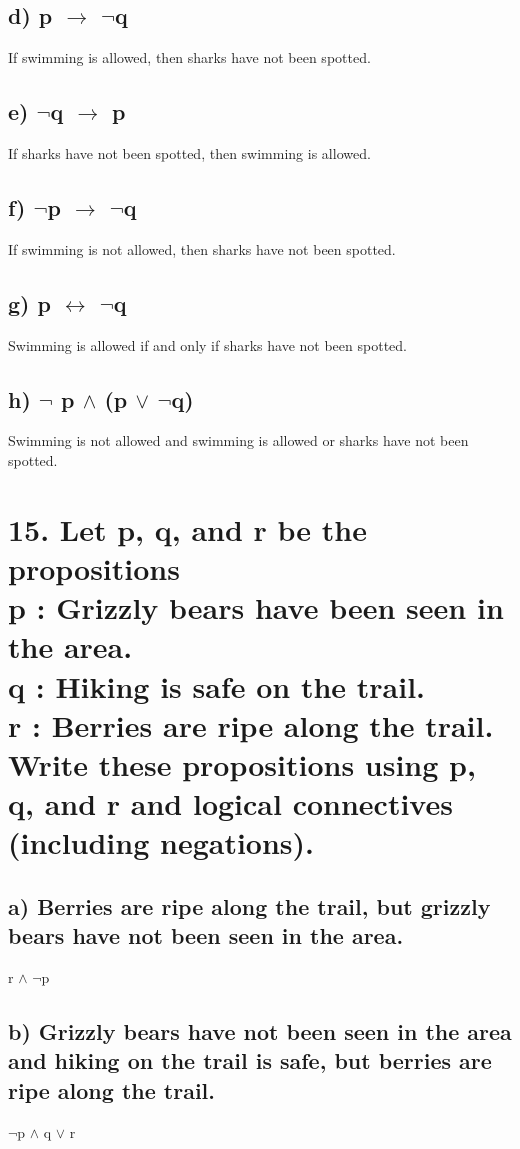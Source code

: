 \documentclass[11pt, oneside]{article} %
\numberwithin{equation}{section} %
\numberwithin{figure}{section} %
\begin{document}
\subsection{d) p $\rightarrow$ $\neg$q}
If swimming is allowed, then sharks have not been spotted.
\subsection{e) $\neg$q $\rightarrow$ p}
If sharks have not been spotted, then swimming is allowed.
\subsection{f) $\neg$p $\rightarrow$ $\neg$q}
If swimming is not allowed, then sharks have not been spotted.
\subsection{g) p $\leftrightarrow$ $\neg$q}
Swimming is allowed if and only if sharks have not been spotted.
\subsection{h) $\neg$ p $\wedge$ (p $\vee$ $\neg$q)}
Swimming is not allowed and swimming is allowed or sharks have not been spotted.

\section{15. Let p, q, and r be the propositions\\
p : Grizzly bears have been seen in the area.\\
q : Hiking is safe on the trail.\\
r : Berries are ripe along the trail.\\
Write these propositions using p, q, and r and logical connectives (including negations).}
\subsection{a) Berries are ripe along the trail, but grizzly bears have not been seen in the area.}
r $\wedge$ $\neg$p
\subsection{b) Grizzly bears have not been seen in the area and hiking on the trail is safe, but berries are ripe along the trail.}
$\neg$p $\wedge$ q $\vee$ r
\end{document}
